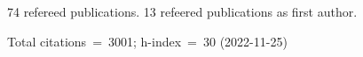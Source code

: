 74 refereed publications. 13 refeered publications as first author.

Total citations~=~3001; h-index~=~30 (2022-11-25)